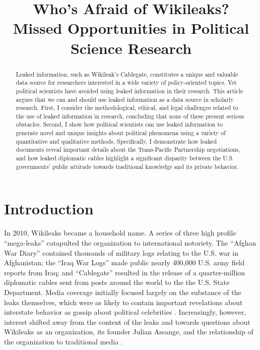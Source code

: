 \documentclass[12pt]{article}
\title{Who's Afraid of Wikileaks? \\ \vspace{2 mm} \large Missed Opportunities in Political Science Research}
\begin{document}
\maketitle

\doublespacing

\begin{abstract}
Leaked information, such as Wikileak's Cablegate, constitutes a unique and valuable data source for researchers
interested in a wide variety of policy-oriented topics. Yet political scientists have avoided using
leaked information in their research. This article argues that we can and should use leaked information 
as a data source in scholarly research. First, I consider the
methodological, ethical, and legal challenges related to the use of leaked information in research, concluding 
that none of these present serious obstacles. 
Second, I show how political scientists can use leaked information to generate novel and unique 
insights about political phenomena using a variety of quantitative and qualitative methods. Specifically, 
I demonstrate how leaked documents reveal important details about the Trans-Pacific Partnership 
negotiations, and how leaked diplomatic cables highlight a significant disparity between the U.S. governments' 
public attitude towards traditional knowledge and its private behavior.
\end{abstract}

\section{Introduction}

In 2010, Wikileaks became a household name. A series of three high profile ``mega-leaks'' 
catapulted the organization to international notoriety.
The ``Afghan War Diary'' contained thousands of military logs relating to the U.S. war in Afghanistan;
the ``Iraq War Logs'' made public nearly 400,000 U.S. 
army field reports from Iraq; and ``Cablegate'' resulted in the release of a quarter-million 
diplomatic cables sent from posts around the world to the the U.S. State Department.
Media coverage initially focused largely on the substance of the leaks themselves, which were as likely to contain 
important revelations about interstate behavior as gossip about political celebrities \citep{shane2010wikileaks,hooper2010silvio}.
Increasingly, however, interest shifted away from the content of the leaks and towards questions 
about Wikileaks as an organization, its founder Julian Assange, and the relationship of the organization 
to traditional media \citep{saunders2011wikileaks,benkler2011free}.
\end{document}
